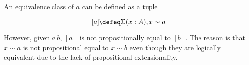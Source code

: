 




















An equivalence class of $a$ can be defined as a tuple

$$[ a ] \defeq \Sigma (x : A) , x \sim a $$

However, given $a ~ b$, $[ a ]$ is not propositionally equal to $[ b ]$. The reason is that $x \sim a$ is not propositional equal to $x \sim b$ even though they are logically equivalent due to the lack of propositional extensionality.


